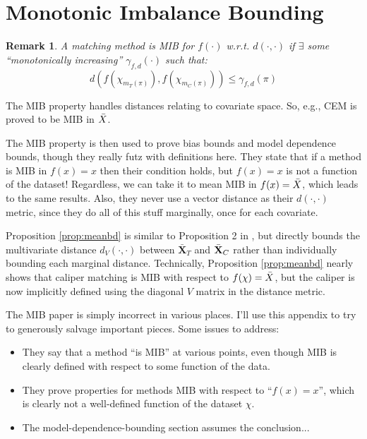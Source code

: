 \documentclass{article}
\newtheorem{remark}{Remark}
\newcommand{\bX}{\mathbf{X}}
\begin{document}
\section{Monotonic Imbalance Bounding}
\label{app:mib}

\begin{remark}
    A matching method is MIB for $f(\cdot)$ w.r.t. $d(\cdot, \cdot)$ if $\exists$ some ``monotonically increasing'' $\gamma_{f,d}(\cdot)$  such that:
    $$d(f(\chi_{m_T(\pi)}), f(\chi_{m_C(\pi)})) \leq \gamma_{f,d}(\pi)$$
\end{remark}
The MIB property handles distances relating to covariate space.
So, e.g., CEM is proved to be MIB in $\Bar{X}$.

The MIB property is then used to prove bias bounds and model dependence bounds, though they really futz with definitions here.
They state that if a method is MIB in $f(x) = x$ then their condition holds, but $f(x)=x$ is not a function of the dataset!
Regardless, we can take it to mean MIB in $f(x) = \Bar{X}$, which leads to the same results.
Also, they never use a vector distance as their $d(\cdot, \cdot)$ metric, since they do all of this stuff marginally, once for each covariate.


Proposition \ref{prop:meanbd} is similar to Proposition 2 in \citet{iacus2011multivariate}, but directly bounds the multivariate distance $d_V(\cdot,\cdot)$ between $\bar{\bX}_T$ and $\Bar{\bX}_C$ rather than individually bounding each marginal distance.
Technically, Proposition \ref{prop:meanbd} nearly shows that caliper matching is MIB with respect to $f(\chi)=\Bar{X}$, but the caliper is now implicitly defined using the diagonal $V$ matrix in the distance metric.


The MIB paper is simply incorrect in various places.
I'll use this appendix to try to generously salvage important pieces.
Some issues to address:
\begin{itemize}
    \item They say that a method ``is MIB'' at various points, even though MIB is clearly defined with respect to some function of the data.
    \item They prove properties for methods MIB with respect to ``$f(x)=x$'', which is clearly not a well-defined function of the dataset $\chi$.
    \item The model-dependence-bounding section assumes the conclusion...
\end{itemize}


\end{document}
